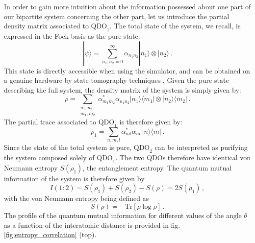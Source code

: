 \documentclass[reprint, amsmath, amssymb, floatfix, aps, pra]{revtex4-2}
\begin{document}
    In order to gain more intuition about the information possessed about one part of our bipartite system concerning the other part, let us introduce the partial density matrix associated to $\text{QDO}_1$. The total state of the system, we recall, is expressed in the Fock basis as the pure state:
    \begin{equation*}
        |\psi\rangle = \sum_{n_1,n_{2}=0}^\infty \alpha_{n_1n_2}|n_1\rangle\otimes|n_2\rangle\,.
    \end{equation*}
    This state is directly accessible when using the simulator, and can be obtained on a genuine hardware by state tomography techniques \cite{Lvovsky:2009zz}. Given the pure state describing the full system, the density matrix of the system is simply given by:
    \begin{equation*}
        \rho = \sum_{\substack{n_1,n_2 \\ m_1,m_2}} \alpha^*_{m_1m_2}\alpha_{n_1n_2}|n_1\rangle\langle m_1|\otimes|n_2\rangle\langle m_2|\,.
    \end{equation*}
    The partial trace associated to $\text{QDO}_1$ is therefore given by:
    \begin{equation*}
        \rho_1 = \sum_{n, m, l} \alpha^*_{ml}\alpha_{nl}\,|n\rangle\langle m|\,.
    \end{equation*}
    Since the state of the total system is pure, $\text{QDO}_2$ can be interpreted as purifying the system composed solely of $\text{QDO}_1$. The two QDOs therefore have identical von Neumann entropy $S(\rho_1)$, the entanglement entropy. The quantum mutual information of the system is therefore given by
    \begin{equation*}
        I(1:2) = S(\rho_1) + S(\rho_2) - S(\rho) = 2S(\rho_1) \,,
    \end{equation*}
    with the von Neumann entropy being defined as
    \begin{equation*}
        S(\rho) = -\text{Tr}\left[\rho\log\rho\right]\,.
    \end{equation*}
    The profile of the quantum mutual information for different values of the angle $\theta$ as a function of the interatomic distance is provided in fig. \ref{fig:entropy_correlation} (top).
\end{document}
